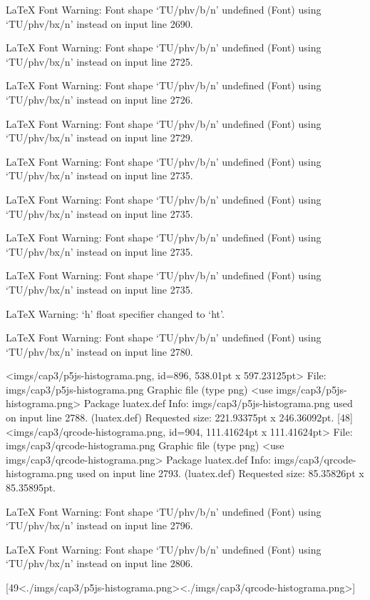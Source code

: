 LaTeX Font Warning: Font shape `TU/phv/b/n' undefined
(Font)              using `TU/phv/bx/n' instead on input line 2690.


LaTeX Font Warning: Font shape `TU/phv/b/n' undefined
(Font)              using `TU/phv/bx/n' instead on input line 2725.


LaTeX Font Warning: Font shape `TU/phv/b/n' undefined
(Font)              using `TU/phv/bx/n' instead on input line 2726.


LaTeX Font Warning: Font shape `TU/phv/b/n' undefined
(Font)              using `TU/phv/bx/n' instead on input line 2729.


LaTeX Font Warning: Font shape `TU/phv/b/n' undefined
(Font)              using `TU/phv/bx/n' instead on input line 2735.


LaTeX Font Warning: Font shape `TU/phv/b/n' undefined
(Font)              using `TU/phv/bx/n' instead on input line 2735.


LaTeX Font Warning: Font shape `TU/phv/b/n' undefined
(Font)              using `TU/phv/bx/n' instead on input line 2735.


LaTeX Font Warning: Font shape `TU/phv/b/n' undefined
(Font)              using `TU/phv/bx/n' instead on input line 2735.


LaTeX Warning: `h' float specifier changed to `ht'.


LaTeX Font Warning: Font shape `TU/phv/b/n' undefined
(Font)              using `TU/phv/bx/n' instead on input line 2780.

<imgs/cap3/p5js-histograma.png, id=896, 538.01pt x 597.23125pt>
File: imgs/cap3/p5js-histograma.png Graphic file (type png)
<use imgs/cap3/p5js-histograma.png>
Package luatex.def Info: imgs/cap3/p5js-histograma.png  used on input line 2788.
(luatex.def)             Requested size: 221.93375pt x 246.36092pt.
[48]
<imgs/cap3/qrcode-histograma.png, id=904, 111.41624pt x 111.41624pt>
File: imgs/cap3/qrcode-histograma.png Graphic file (type png)
<use imgs/cap3/qrcode-histograma.png>
Package luatex.def Info: imgs/cap3/qrcode-histograma.png  used on input line 2793.
(luatex.def)             Requested size: 85.35826pt x 85.35895pt.

LaTeX Font Warning: Font shape `TU/phv/b/n' undefined
(Font)              using `TU/phv/bx/n' instead on input line 2796.


LaTeX Font Warning: Font shape `TU/phv/b/n' undefined
(Font)              using `TU/phv/bx/n' instead on input line 2806.

[49<./imgs/cap3/p5js-histograma.png><./imgs/cap3/qrcode-histograma.png>]

